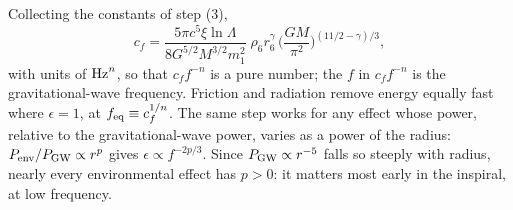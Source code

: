 Collecting the constants of step (3),
\begin{equation}
  c_f=\frac{5\pi c^5\xi\ln\Lambda}{8G^{5/2}M^{3/2}m_1^2}\;\rho_6r_6^{\gamma}\,\Big(\frac{GM}{\pi^2}\Big)^{(11/2-\gamma)/3},
  \label{T2a:eq:cf}
\end{equation}
with units of ${\rm Hz}^n$, so that $c_ff^{-n}$ is a pure number; the $f$ in $c_ff^{-n}$ is the gravitational-wave frequency. Friction and radiation remove energy equally fast where $\epsilon=1$, at $f_{\rm eq}\equiv c_f^{1/n}$.
The same step works for any effect whose power, relative to the gravitational-wave power, varies as a power of the radius: $P_{\rm env}/P_{\rm GW}\propto r^p$ gives $\epsilon\propto f^{-2p/3}$. Since $P_{\rm GW}\propto r^{-5}$ falls so steeply with radius, nearly every environmental effect has $p>0$: it matters most early in the inspiral, at low frequency.

